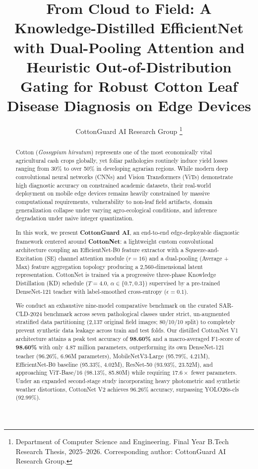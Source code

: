 \documentclass[journal,10pt,twocolumn]{IEEEtran}
\begin{document}
\title{From Cloud to Field: A Knowledge-Distilled EfficientNet with Dual-Pooling Attention and Heuristic Out-of-Distribution Gating for Robust Cotton Leaf Disease Diagnosis on Edge Devices}

\author{CottonGuard AI Research Group%
\thanks{Department of Computer Science and Engineering. Final Year B.Tech Research Thesis, 2025--2026. Corresponding author: CottonGuard AI Research Group.}%
}

\maketitle

\begin{abstract}
Cotton (\textit{Gossypium hirsutum}) represents one of the most economically vital agricultural cash crops globally, yet foliar pathologies routinely induce yield losses ranging from 30\% to over 50\% in developing agrarian regions. While modern deep convolutional neural networks (CNNs) and Vision Transformers (ViTs) demonstrate high diagnostic accuracy on constrained academic datasets, their real-world deployment on mobile edge devices remains heavily constrained by massive computational requirements, vulnerability to non-leaf field artifacts, domain generalization collapse under varying agro-ecological conditions, and inference degradation under naive integer quantization. 

In this work, we present \textbf{CottonGuard AI}, an end-to-end edge-deployable diagnostic framework centered around \textbf{CottonNet}: a lightweight custom convolutional architecture coupling an EfficientNet-B0 feature extractor with a Squeeze-and-Excitation (SE) channel attention module ($r=16$) and a dual-pooling (Average + Max) feature aggregation topology producing a 2,560-dimensional latent representation. CottonNet is trained via a progressive three-phase Knowledge Distillation (KD) schedule ($T=4.0$, $\alpha \in \{0.7, 0.3\}$) supervised by a pre-trained DenseNet-121 teacher with label-smoothed cross-entropy ($\epsilon=0.1$). 

We conduct an exhaustive nine-model comparative benchmark on the curated SAR-CLD-2024 benchmark across seven pathological classes under strict, un-augmented stratified data partitioning (2,137 original field images; 80/10/10 split) to completely prevent synthetic data leakage across train and test folds. Our distilled CottonNet V1 architecture attains a peak test accuracy of \textbf{98.60\%} and a macro-averaged F1-score of \textbf{98.60\%} with only 4.87 million parameters, outperforming its own DenseNet-121 teacher (96.26\%, 6.96M parameters), MobileNetV3-Large (95.79\%, 4.21M), EfficientNet-B0 baseline (95.33\%, 4.02M), ResNet-50 (93.93\%, 23.52M), and approaching ViT-Base/16 (98.13\%, 85.80M) while requiring $17.6\times$ fewer parameters. Under an expanded second-stage study incorporating heavy photometric and synthetic weather distortions, CottonNet V2 achieves 96.26\% accuracy, surpassing YOLO26s-cls (92.99\%). 


\end{abstract}
\end{document}
